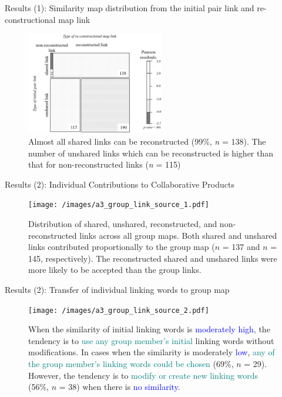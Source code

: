 \begin{frame}{Results (1): Similarity map distribution from the initial pair link and re-constructional map link}
\begin{figure}[tb]
    \begin{center}
        \includegraphics[width=60mm]{images/a3_prior_comprehension_distribution.pdf}
    \end{center}
    \caption{Almost all shared links can be reconstructed (99\%, \textit{n} = 138). The number of unshared links which can be reconstructed is higher than that for non-reconstructed links (\textit{n} = 115)}
    \label{prior_comprehension_dist}
\end{figure}
\end{frame}

\begin{frame}{Results (2): Individual Contributions to Collaborative Products}
    \begin{figure}[tb]
        \begin{center}
            \texttt{[image: /images/a3\_group\_link\_source\_1.pdf]}
        \end{center}
        \caption{Distribution of shared, unshared, reconstructed, and non-reconstructed links across all group maps. Both shared and unshared links contributed proportionally to the group map ($n$ = 137 and $n$ = 145, respectively). The reconstructed shared and unshared links were more likely to be accepted than the group links.}
        \label{group_link_s1}
    \end{figure}
\end{frame}



\begin{frame}{Results (2): Transfer of individual linking words to group map}
    \begin{figure}[tb]
        \begin{center}
            \texttt{[image: /images/a3\_group\_link\_source\_2.pdf]}
        \end{center}
        \caption{{\footnotesize When the similarity of initial linking words is \textcolor{blue}{moderately high}, the tendency is to \textcolor{teal}{use any group member's initial} linking words without modifications. In cases when the similarity is moderately \textcolor{blue}{low}, \textcolor{teal}{any of the group member's linking words could be chosen} (69\%, $n$ = 29). However, the tendency is to \textcolor{teal}{modify or create new linking words} (56\%, $n$ = 38) when there is \textcolor{blue}{no similarity}.}}
        \label{group_link_s2}
    \end{figure}
\end{frame}


